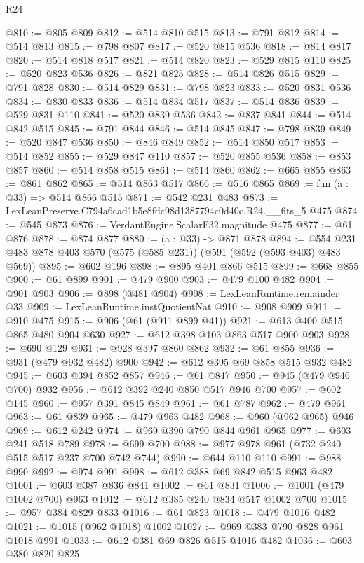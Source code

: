 \begin{lexlean}{R24}
\begin{coremodule}
@810 := @805 @809
@812 := @514 @810 @515
@813 := @791 @812
@814 := @514 @813
@815 := @798 @807
@817 := @520 @815 @536
@818 := @814 @817
@820 := @514 @818 @517
@821 := @514 @820
@823 := @529 @815 @110
@825 := @520 @823 @536
@826 := @821 @825
@828 := @514 @826 @515
@829 := @791 @828
@830 := @514 @829
@831 := @798 @823
@833 := @520 @831 @536
@834 := @830 @833
@836 := @514 @834 @517
@837 := @514 @836
@839 := @529 @831 @110
@841 := @520 @839 @536
@842 := @837 @841
@844 := @514 @842 @515
@845 := @791 @844
@846 := @514 @845
@847 := @798 @839
@849 := @520 @847 @536
@850 := @846 @849
@852 := @514 @850 @517
@853 := @514 @852
@855 := @529 @847 @110
@857 := @520 @855 @536
@858 := @853 @857
@860 := @514 @858 @515
@861 := @514 @860
@862 := @665 @855
@863 := @861 @862
@865 := @514 @863 @517
@866 := @516 @865
@869 := fun (a : @33) => @514 @866 @515
@871 := @542 @231 @483
@873 := LexLeanPreserve.C794a6cad1b5e8fdc98d1387794c0d40c.R24.__fits_5 @475
@874 := @545 @873
@876 := VerdantEngine.ScalarF32.magnitude @475
@877 := @61 @876
@878 := @874 @877
@880 := (a : @33) -> @871 @878
@894 := @554 @231 @483 @878 @403 @570 (@575 (@585 @231)) (@591 (@592 (@593 @403) @483 @569))
@895 := @602 @196
@898 := @895 @401 @866 @515
@899 := @668 @855
@900 := @61 @899
@901 := @479 @900
@903 := @479 @100 @482
@904 := @901 @903
@906 := @898 (@481 @904)
@908 := LexLeanRuntime.remainder @33
@909 := LexLeanRuntime.instQuotientNat
@910 := @908 @909
@911 := @910 @475
@915 := @906 (@61 (@911 @899 @41))
@921 := @613 @400 @515 @865 @480 @904 @630
@927 := @612 @398 @103 @863 @517 @900 @903
@928 := @690 @129
@931 := @928 @397 @860 @862
@932 := @61 @855
@936 := @931 (@479 @932 @482) @900
@942 := @612 @395 @69 @858 @515 @932 @482
@945 := @603 @394 @852 @857
@946 := @61 @847
@950 := @945 (@479 @946 @700) @932
@956 := @612 @392 @240 @850 @517 @946 @700
@957 := @602 @145
@960 := @957 @391 @845 @849
@961 := @61 @787
@962 := @479 @961
@963 := @61 @839
@965 := @479 @963 @482
@968 := @960 (@962 @965) @946
@969 := @612 @242
@974 := @969 @390 @790 @844 @961 @965
@977 := @603 @241 @518 @789
@978 := @699 @700
@988 := @977 @978 @961 (@732 @240 @515 @517 @237 @700 @742 @744)
@990 := @644 @110 @110
@991 := @988 @990
@992 := @974 @991
@998 := @612 @388 @69 @842 @515 @963 @482
@1001 := @603 @387 @836 @841
@1002 := @61 @831
@1006 := @1001 (@479 @1002 @700) @963
@1012 := @612 @385 @240 @834 @517 @1002 @700
@1015 := @957 @384 @829 @833
@1016 := @61 @823
@1018 := @479 @1016 @482
@1021 := @1015 (@962 @1018) @1002
@1027 := @969 @383 @790 @828 @961 @1018 @991
@1033 := @612 @381 @69 @826 @515 @1016 @482
@1036 := @603 @380 @820 @825

\end{coremodule}
\end{lexlean}
